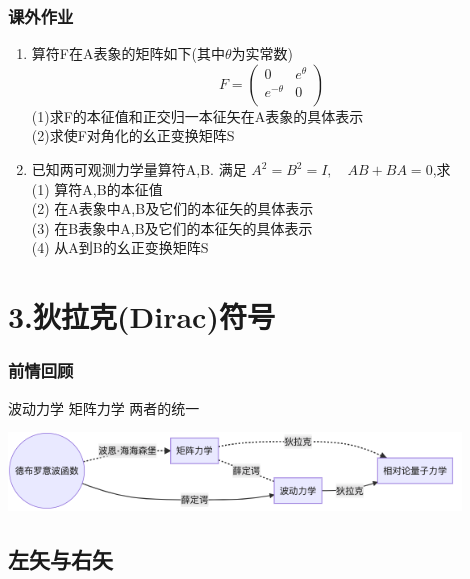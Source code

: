 \begin{frame}
    \frametitle{课外作业}
    \begin{enumerate}
        \item 算符F在A表象的矩阵如下(其中$\theta$为实常数) \\ 
        \[ F= \begin{pmatrix}
          0 & e^{\theta} \\
          e^{-\theta} & 0 \\
        \end{pmatrix} \]
        (1)求F的本征值和正交归一本征矢在A表象的具体表示\\
        (2)求使F对角化的幺正变换矩阵S
        \item 已知两可观测力学量算符A,B. 满足 $A^2=B^2=I, \quad AB+BA=0$,求 \\ 
              (1) 算符A,B的本征值 \\ 
              (2) 在A表象中A,B及它们的本征矢的具体表示 \\ 
              (3) 在B表象中A,B及它们的本征矢的具体表示 \\ 
              (4) 从A到B的幺正变换矩阵S
    \end{enumerate}
\end{frame}

 
\section{3.狄拉克(Dirac)符号}

\begin{frame}
    \frametitle{前情回顾}
    \begin{itemize}
       \done 波动力学
       \done 矩阵力学
       \todo 两者的统一 
    \end{itemize}
        \begin{center}
            \includegraphics[width=0.9\textwidth]{figs/2021-12-06-16-22-39.png}\\   
        \end{center}    
\end{frame} 

\subsection{左矢与右矢}

